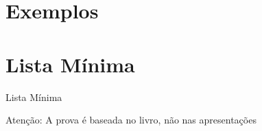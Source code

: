 \section{Exemplos}







\section{Lista Mínima}

\begin{frame}{Lista Mínima}

  \vfill
  Atenção: A prova é baseada no livro, não nas apresentações
\end{frame}


